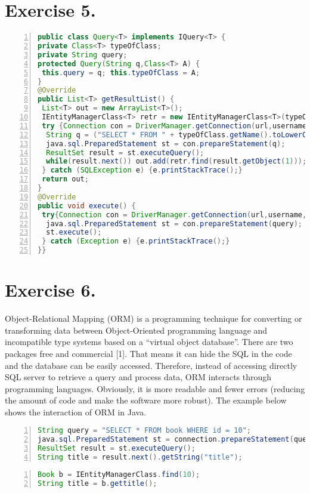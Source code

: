 \documentclass[10pt]{report}
\begin{document}
\section{Exercise 5.}
\label{QueryClass}
\begin{lstlisting}[numbers=left,language=Java,frame=single,breaklines=true,label=Code:ZeroIn, caption=Query Class.]
public class Query<T> implements IQuery<T> {
private Class<T> typeOfClass;
private String query;
protected Query(String q,Class<T> A) {
 this.query = q; this.typeOfClass = A;
}
@Override
public List<T> getResultList() {
 List<T> out = new ArrayList<T>();
 IEntityManagerClass<T> retr = new IEntityManagerClass<T>(typeOfClass);
 try {Connection con = DriverManager.getConnection(url,username,password);
  String q = ("SELECT * FROM " + typeOfClass.getName().toLowerCase() + ";");
  java.sql.PreparedStatement st = con.prepareStatement(q);
  ResultSet result = st.executeQuery();
  while(result.next()) out.add(retr.find(result.getObject(1)));
 } catch (SQLException e) {e.printStackTrace();}
 return out;
}
@Override
public void execute() {
 try{Connection con = DriverManager.getConnection(url,username,password);
  java.sql.PreparedStatement st = con.prepareStatement(query);
  st.execute();
 } catch (Exception e) {e.printStackTrace();}
}}
\end{lstlisting}
\section{Exercise 6.}
\label{Second}
Object-Relational Mapping (ORM) is a programming technique for converting or transforming data between Object-Oriented programming language and incompatible type systems based on a ``virtual object database''. There are two packages free and commercial [1].
That means it can hide the SQL in the code and the database can be easily accessed. Therefore, instead of accessing directly SQL server to retrieve a query and process data, ORM interacts through programming languages. Obviously, it is more readable and fewer errors (reducing the amount of code and make the software more robust). The example below shows the interaction of ORM in Java.
\begin{lstlisting}[numbers=left,language=Java,frame=single,breaklines=true,label=Code:vd1, caption=Example of retrieving data from mySQL by Java.]
String query = "SELECT * FROM book WHERE id = 10";
java.sql.PreparedStatement st = connection.prepareStatement(query);
ResultSet result = st.executeQuery();
String title = result.next().getString("title");
\end{lstlisting}
\begin{lstlisting}[numbers=left,language=Java,frame=single,breaklines=true,label=Code:vd2, caption=Example of retrieving data based on ORM.]
Book b = IEntityManagerClass.find(10);
String title = b.gettitle();
\end{lstlisting}
\end{document}
